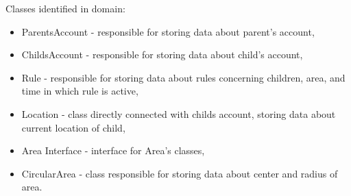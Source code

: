 \documentclass{sprawozdanie-agh}
\begin{document}
		Classes identified in domain:
		\begin{itemize}
			\item ParentsAccount - responsible for storing data about parent's account,
			\item ChildsAccount - responsible for storing data about child's account,
			\item Rule - responsible for storing data about rules concerning children, area, and time in which rule is active, 
			\item Location - class directly connected with childs account, storing data about current location of child,
			\item Area Interface - interface for Area's classes,
			\item CircularArea - class responsible for storing data about center and radius of area.
		\end{itemize}
\end{document}

